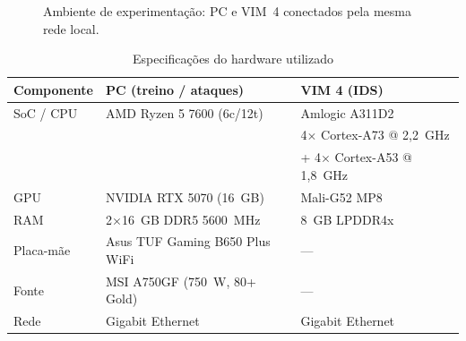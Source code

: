 \documentclass[12pt]{article}
\begin{document}
\begin{figure}[ht]
{}
\caption{Ambiente de experimentação: PC e VIM~4 conectados pela mesma rede local.}
\label{fig:ambiente}
\end{figure}

\begin{table}[ht]
\centering
\caption{Especificações do hardware utilizado}
\label{tab:hardware}
\begin{tabular}{@{}lll@{}}
\toprule
\textbf{Componente} & \textbf{PC (treino / ataques)} & \textbf{VIM 4 (IDS)} \\ \midrule
SoC / CPU & AMD Ryzen 5 7600 (6c/12t) & Amlogic A311D2 \\
          &                            & 4$\times$ Cortex-A73 @ 2,2~GHz \\
          &                            & + 4$\times$ Cortex-A53 @ 1,8~GHz \\
GPU       & NVIDIA RTX 5070 (16~GB)    & Mali-G52 MP8 \\
RAM       & 2$\times$16~GB DDR5 5600~MHz & 8~GB LPDDR4x \\
Placa-mãe & Asus TUF Gaming B650 Plus WiFi & — \\
Fonte     & MSI A750GF (750~W, 80+ Gold) & — \\
Rede      & Gigabit Ethernet           & Gigabit Ethernet \\
\bottomrule
\end{tabular}
\end{table}
\end{document}
